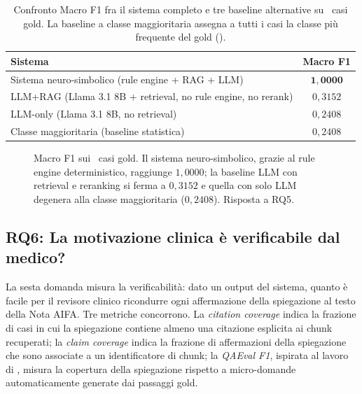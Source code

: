 \begin{table}[t]
  \centering
  \caption{Confronto Macro F1 fra il sistema completo e tre baseline alternative su \goldn\ casi gold. La baseline a classe maggioritaria assegna a tutti i casi la classe più frequente del gold ().}
  \label{tab:baselines}
  \small
  \begin{tabular}{lc}
    \toprule
    Sistema & Macro F1 \\
    \midrule
    Sistema neuro-simbolico (rule engine + RAG + LLM) & $\mathbf{1{,}0000}$ \\
    LLM+RAG (Llama 3.1 8B + retrieval, no rule engine, no rerank) & $0{,}3152$ \\
    LLM-only (Llama 3.1 8B, no retrieval) & $0{,}2408$ \\
    Classe maggioritaria (baseline statistica) & $0{,}2408$ \\
    \bottomrule
  \end{tabular}
\end{table}

\begin{figure}[t]
  \centering
  \caption{Macro F1 sui \goldn\ casi gold. Il sistema neuro-simbolico, grazie al rule engine deterministico, raggiunge $1{,}0000$; la baseline LLM con retrieval e reranking si ferma a $0{,}3152$ e quella con solo LLM degenera alla classe maggioritaria ($0{,}2408$). Risposta a RQ5.}
  \label{fig:baseline-bar}
\end{figure}

\subsection{RQ6: La motivazione clinica è verificabile dal medico?}
\label{sec:rq6}

La sesta domanda misura la verificabilità: dato un output del sistema, quanto è facile per il revisore clinico ricondurre ogni affermazione della spiegazione al testo della Nota AIFA. Tre metriche concorrono. La \emph{citation coverage} indica la frazione di casi in cui la spiegazione contiene almeno una citazione esplicita ai chunk recuperati; la \emph{claim coverage} indica la frazione di affermazioni della spiegazione che sono associate a un identificatore di chunk; la \emph{QAEval F1}, ispirata al lavoro di \citet{deutsch2021qaeval}, misura la copertura della spiegazione rispetto a micro-domande automaticamente generate dai passaggi gold.


